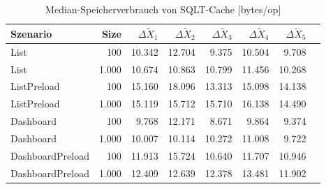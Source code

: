 
\begin{table}[ht]
\setlength{\extrarowheight}{-1pt}
\centering
\caption{Median-Speicherverbrauch von SQLT-Cache [bytes/op]}
\begin{tabular}{lrrrrrrr}
\toprule
Szenario & Size & ${\Delta \tilde{X}_1}$ & ${\Delta \tilde{X}_2}$ & ${\Delta \tilde{X}_3}$ & ${\Delta \tilde{X}_4}$ & ${\Delta \tilde{X}_5}$ \\
\midrule
	List & 100 & \cellcolor{green!25}  10.342 & \cellcolor{green!20}  12.704 & \cellcolor{green!29}  9.375 & \cellcolor{green!25}  10.504 & \cellcolor{green!29}  9.708 \\
	List & 1.000 & \cellcolor{green!24}  10.674 & \cellcolor{green!23}  10.863 & \cellcolor{green!24}  10.799 & \cellcolor{green!22}  11.456 & \cellcolor{green!24}  10.268 \\
	ListPreload & 100 & \cellcolor{green!14}  15.160 & \cellcolor{green!9}  18.096 & \cellcolor{green!21}  13.313 & \cellcolor{green!15}  15.098 & \cellcolor{green!20}  14.138 \\
	ListPreload & 1.000 & \cellcolor{green!16}  15.119 & \cellcolor{green!12}  15.712 & \cellcolor{green!14}  15.710 & \cellcolor{green!12}  16.138 & \cellcolor{green!16}  14.490 \\
	Dashboard & 100 & \cellcolor{green!28}  9.768 & \cellcolor{green!22}  12.171 & \cellcolor{green!34}  8.671 & \cellcolor{green!25}  9.864 & \cellcolor{green!30}  9.374 \\
	Dashboard & 1.000 & \cellcolor{green!29}  10.007 & \cellcolor{green!28}  10.114 & \cellcolor{green!26}  10.272 & \cellcolor{green!23}  11.008 & \cellcolor{green!28}  9.722 \\
	DashboardPreload & 100 & \cellcolor{green!24}  11.913 & \cellcolor{green!15}  15.724 & \cellcolor{green!31}  10.640 & \cellcolor{green!23}  11.707 & \cellcolor{green!30}  10.946 \\
	DashboardPreload & 1.000 & \cellcolor{green!25}  12.409 & \cellcolor{green!23}  12.639 & \cellcolor{green!23}  12.378 & \cellcolor{green!19}  13.481 & \cellcolor{green!24}  11.902 \\
\bottomrule
\end{tabular}
\label{tab:speicherverbrauch_sqltcache}
\end{table}
	